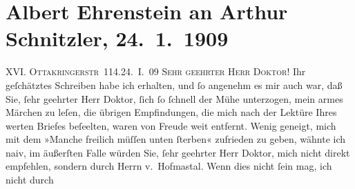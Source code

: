 

         
         \renewcommand{\erwaehntePersonen}{Personen: Albert Ehrenstein, Camill Hoffmann, Hugo von Hofmannsthal}
         \renewcommand{\erwaehnteInstitutionen}{Institutionen: Erdgeist, Neue Freie Presse}
         \renewcommand{\erwaehnteOrte}{Orte: Ottakringerstraße, Wien}
         \renewcommand{\erwaehnteWerke}{Werke: Die Zeit, Manche freilich, Tai-Gin}
               \section[Albert Ehrenstein an Arthur Schnitzler, 24. 1. 1909]{ Albert Ehrenstein an Arthur Schnitzler, 24. 1. 1909}\nopagebreak{}\rehead{ }\begin{ledgroupsized}[t]{13cm}\normalsize\beginnumbering \toendnotes[C]{\smallbreak\pagebreak[2]} 
\toendnotes[C]{\smallbreak}\pstart
           {\pb}XVI. \textsc{Ottakringerstr} 114.\hfill 24. I. 09\pend
           \pstart{}\textsc{Sehr geehrter Herr Doktor!}\pend\pstart
           Ihr geſchätztes Schreiben habe ich erhalten, und ſo angenehm es mir auch war, daß
               Sie, ſehr geehrter Herr Doktor, ſich ſo ſchnell der Mühe unterzogen, mein armes Märchen zu leſen, die übrigen
               Empfindungen, die mich nach der Lektüre Ihres werten Briefes beſeelten, waren von
               Freude weit entfernt. Wenig geneigt, mich mit dem »Manche freilich müſſen unten ſterben« zufrieden zu geben,
               wähnte ich naiv, im äußerſten Falle würden Sie, ſehr geehrter Herr Doktor, mich nicht
               direkt empfehlen, sondern durch Herrn v. Hofma{\geminationn}stal. Wenn dies nicht ſein mag, ich nicht durch

\end{ledgroupsized}

